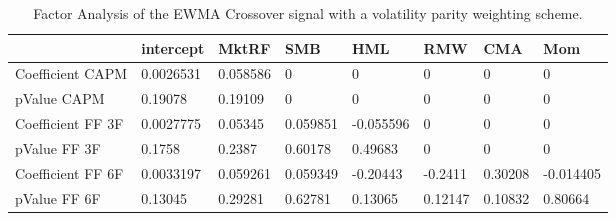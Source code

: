 \begin{table}[H]
\centering
\begin{tabular}{llllllll}
& intercept & MktRF & SMB & HML & RMW & CMA & Mom \\ 
\hline 
Coefficient CAPM & 0.0026531 & 0.058586 & 0 & 0 & 0 & 0 & 0 \\ 
pValue CAPM & 0.19078 & 0.19109 & 0 & 0 & 0 & 0 & 0 \\ 
Coefficient FF 3F & 0.0027775 & 0.05345 & 0.059851 & -0.055596 & 0 & 0 & 0 \\ 
pValue FF 3F & 0.1758 & 0.2387 & 0.60178 & 0.49683 & 0 & 0 & 0 \\ 
Coefficient FF 6F & 0.0033197 & 0.059261 & 0.059349 & -0.20443 & -0.2411 & 0.30208 & -0.014405 \\ 
pValue FF 6F & 0.13045 & 0.29281 & 0.62781 & 0.13065 & 0.12147 & 0.10832 & 0.80664 \\ 
\hline
\end{tabular}
\caption{Factor Analysis of the EWMA Crossover signal with a volatility parity weighting scheme.}
\label{MBBSLeverage_FACTOR}
\end{table}